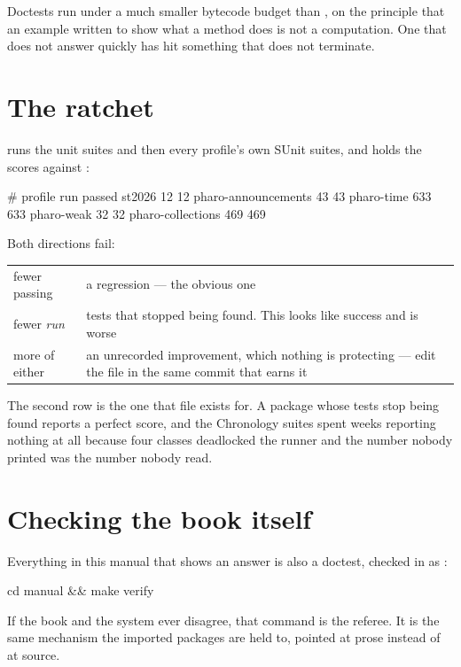 Doctests run under a much smaller bytecode budget than , on the
principle that an example written to show what a method does is not a
computation. One that does not answer quickly has hit something that does not
terminate.

\section{The ratchet}

 runs the unit suites and then every profile's own SUnit suites,
and holds the scores against :

\begin{plain}
# profile               run  passed
st2026                  12   12
pharo-announcements     43   43
pharo-time              633  633
pharo-weak              32   32
pharo-collections       469  469
\end{plain}

Both directions fail:

\begin{center}
\small
\begin{tabular}{@{}lp{}@{}}
\toprule
fewer passing & a regression --- the obvious one\\
fewer \emph{run} & tests that stopped being found. This looks like success and
  is worse\\
more of either & an unrecorded improvement, which nothing is protecting ---
  edit the file in the same commit that earns it\\
\bottomrule
\end{tabular}
\end{center}

The second row is the one that file exists for. A package whose tests stop
being found reports a perfect score, and the Chronology suites spent weeks
reporting nothing at all because four classes deadlocked the runner and the
number nobody printed was the number nobody read.

\section{Checking the book itself}

Everything in this manual that shows an answer is also a doctest, checked in
as :

\begin{sh}
cd manual && make verify
\end{sh}

If the book and the system ever disagree, that command is the referee. It is
the same mechanism the imported packages are held to, pointed at prose instead
of at source.

